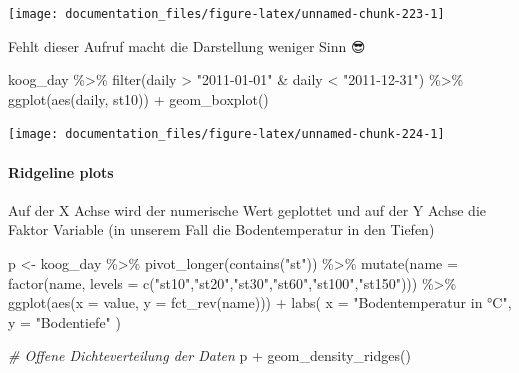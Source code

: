 \documentclass[
]{article}
\newenvironment{Shaded}{\begin{snugshade}}{\end{snugshade}}
\newcommand{\AttributeTok}[1]{\textcolor[rgb]{0.77,0.63,0.00}{#1}}
\newcommand{\CommentTok}[1]{\textcolor[rgb]{0.56,0.35,0.01}{\textit{#1}}}
\newcommand{\FunctionTok}[1]{\textcolor[rgb]{0.00,0.00,0.00}{#1}}
\newcommand{\NormalTok}[1]{#1}
\newcommand{\OtherTok}[1]{\textcolor[rgb]{0.56,0.35,0.01}{#1}}
\newcommand{\SpecialCharTok}[1]{\textcolor[rgb]{0.00,0.00,0.00}{#1}}
\newcommand{\StringTok}[1]{\textcolor[rgb]{0.31,0.60,0.02}{#1}}
\begin{document}
\begin{center}\texttt{[image: documentation\_files/figure-latex/unnamed-chunk-223-1]} \end{center}

Fehlt dieser Aufruf macht die Darstellung weniger Sinn 😎

\begin{Shaded}
\begin{Highlighting}[]
\NormalTok{koog\_day }\SpecialCharTok{\%\textgreater{}\%}
  \FunctionTok{filter}\NormalTok{(daily }\SpecialCharTok{\textgreater{}} \StringTok{"2011{-}01{-}01"} \SpecialCharTok{\&}\NormalTok{ daily }\SpecialCharTok{\textless{}} \StringTok{"2011{-}12{-}31"}\NormalTok{) }\SpecialCharTok{\%\textgreater{}\%}
  \FunctionTok{ggplot}\NormalTok{(}\FunctionTok{aes}\NormalTok{(daily, st10)) }\SpecialCharTok{+}
  \FunctionTok{geom\_boxplot}\NormalTok{()}
\end{Highlighting}
\end{Shaded}

\begin{center}\texttt{[image: documentation\_files/figure-latex/unnamed-chunk-224-1]} \end{center}

\hypertarget{ridgeline-plots}{%
\paragraph{Ridgeline plots}\label{ridgeline-plots}}

Auf der X Achse wird der numerische Wert geplottet und auf der Y Achse die Faktor Variable (in unserem Fall die Bodentemperatur in den Tiefen)

\begin{Shaded}
\begin{Highlighting}[]
\NormalTok{p }\OtherTok{\textless{}{-}}\NormalTok{ koog\_day }\SpecialCharTok{\%\textgreater{}\%}
  \FunctionTok{pivot\_longer}\NormalTok{(}\FunctionTok{contains}\NormalTok{(}\StringTok{"st"}\NormalTok{)) }\SpecialCharTok{\%\textgreater{}\%}
  \FunctionTok{mutate}\NormalTok{(}\AttributeTok{name =} \FunctionTok{factor}\NormalTok{(name, }\AttributeTok{levels =} \FunctionTok{c}\NormalTok{(}\StringTok{"st10"}\NormalTok{,}\StringTok{"st20"}\NormalTok{,}\StringTok{"st30"}\NormalTok{,}\StringTok{"st60"}\NormalTok{,}\StringTok{"st100"}\NormalTok{,}\StringTok{"st150"}\NormalTok{))) }\SpecialCharTok{\%\textgreater{}\%}
  \FunctionTok{ggplot}\NormalTok{(}\FunctionTok{aes}\NormalTok{(}\AttributeTok{x =}\NormalTok{ value, }\AttributeTok{y =} \FunctionTok{fct\_rev}\NormalTok{(name))) }\SpecialCharTok{+}
  \FunctionTok{labs}\NormalTok{(}
    \AttributeTok{x =} \StringTok{"Bodentemperatur in °C"}\NormalTok{, }
    \AttributeTok{y =} \StringTok{"Bodentiefe"}
\NormalTok{  )}

\CommentTok{\# Offene Dichteverteilung der Daten}
\NormalTok{p }\SpecialCharTok{+} \FunctionTok{geom\_density\_ridges}\NormalTok{()}
\end{Highlighting}
\end{Shaded}
\end{document}
